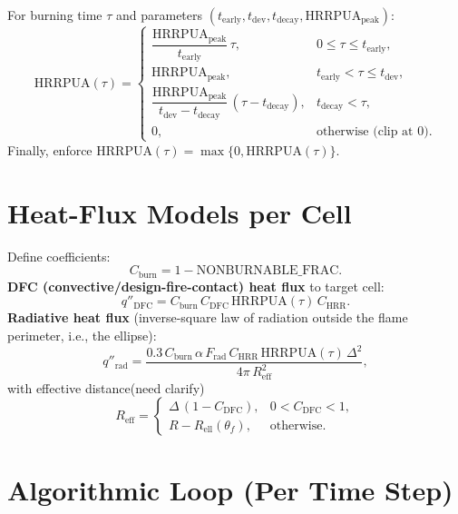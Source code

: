 \documentclass[a4paper,12pt]{article}
\begin{document}
For burning time $\tau$ and parameters $(t_{\mathrm{early}}, t_{\mathrm{dev}}, t_{\mathrm{decay}}, \mathrm{HRRPUA_{peak}})$:
\begin{equation}
\mathrm{HRRPUA}(\tau)=
\begin{cases}
\dfrac{\mathrm{HRRPUA_{peak}}}{t_{\mathrm{early}}}\,\tau, & 0\le \tau\le t_{\mathrm{early}},\\[8pt]
\mathrm{HRRPUA_{peak}}, & t_{\mathrm{early}}<\tau\le t_{\mathrm{dev}},\\[6pt]
\dfrac{\mathrm{HRRPUA_{peak}}}{t_{\mathrm{dev}}-t_{\mathrm{decay}}}\,(\tau-t_{\mathrm{decay}}), & t_{\mathrm{decay}}<\tau,\\[8pt]
0,& \text{otherwise (clip at }0\text{)}.
\end{cases}
\end{equation}
Finally, enforce $\mathrm{HRRPUA}(\tau)=\max\{0,\mathrm{HRRPUA}(\tau)\}$.

\section{Heat-Flux Models per Cell}\label{heat_flux_calc_2}

Define coefficients:
\begin{equation}
C_{\mathrm{burn}}=1-\mathrm{NONBURNABLE\_FRAC}.
\end{equation}
\textbf{DFC (convective/design-fire-contact) heat flux} to target cell:
\begin{equation}
q''_{\mathrm{DFC}}=C_{\mathrm{burn}}\,C_{\mathrm{DFC}}\,\mathrm{HRRPUA}(\tau)\,C_\mathrm{HRR}.
\end{equation}
\textbf{Radiative heat flux} (inverse-square law of radiation outside the flame perimeter, i.e., the ellipse):
\begin{equation}
q''_{\mathrm{rad}}=\frac{0.3\,C_{\mathrm{burn}}\,\alpha\,F_{\mathrm{rad}}\,C_\mathrm{HRR}\,\mathrm{HRRPUA}(\tau)\,\Delta^2}{4\pi\,R_{\mathrm{eff}}^2},
\end{equation}
with effective distance(need clarify)
\begin{equation}
R_{\mathrm{eff}}=\begin{cases}
\Delta\,(1-C_{\mathrm{DFC}}), & 0<C_{\mathrm{DFC}}<1,\\[4pt]
R- R_{\mathrm{ell}}(\theta_f), & \text{otherwise}.
\end{cases}
\end{equation}

\section{Algorithmic Loop (Per Time Step)}
\end{document}
